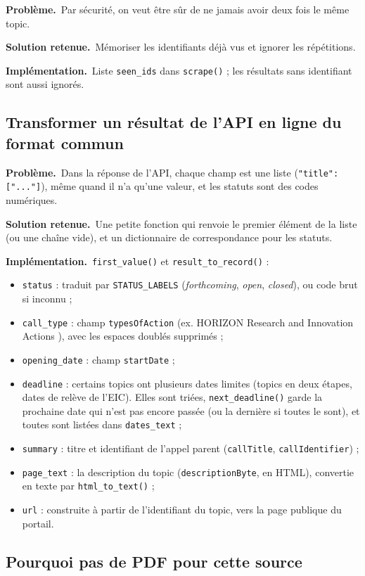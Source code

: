\documentclass[11pt,a4paper]{article}
\newcommand{\pb}{\par\medskip\noindent\textbf{\textcolor{pbcolor}{Problème.}}\ }
\newcommand{\sol}{\par\medskip\noindent\textbf{\textcolor{solcolor}{Solution retenue.}}\ }
\newcommand{\impl}{\par\medskip\noindent\textbf{\textcolor{implcolor}{Implémentation.}}\ }
\newcommand{\code}[1]{\texttt{#1}}
\begin{document}
\pb Par sécurité, on veut être sûr de ne jamais avoir deux fois le même topic.

\sol Mémoriser les identifiants déjà vus et ignorer les répétitions.

\impl Liste \code{seen\_ids} dans \code{scrape()} ; les résultats sans identifiant sont
aussi ignorés.

\subsection{Transformer un résultat de l'API en ligne du format commun}

\pb Dans la réponse de l'API, chaque champ est une liste (\code{"title": ["..."]}), même
quand il n'a qu'une valeur, et les statuts sont des codes numériques.

\sol Une petite fonction qui renvoie le premier élément de la liste (ou une chaîne vide),
et un dictionnaire de correspondance pour les statuts.

\impl \code{first\_value()} et \code{result\_to\_record()} :
\begin{itemize}
  \item \code{status} : traduit par \code{STATUS\_LABELS} (\emph{forthcoming}, \emph{open},
        \emph{closed}), ou code brut si inconnu ;
  \item \code{call\_type} : champ \code{typesOfAction} (ex. \og HORIZON Research and Innovation
        Actions \fg), avec les espaces doublés supprimés ;
  \item \code{opening\_date} : champ \code{startDate} ;
  \item \code{deadline} : certains topics ont plusieurs dates limites (topics en deux étapes,
        dates de relève de l'EIC). Elles sont triées, \code{next\_deadline()} garde la
        prochaine date qui n'est pas encore passée (ou la dernière si toutes le sont), et
        toutes sont listées dans \code{dates\_text} ;
  \item \code{summary} : titre et identifiant de l'appel parent (\code{callTitle},
        \code{callIdentifier}) ;
  \item \code{page\_text} : la description du topic (\code{descriptionByte}, en HTML),
        convertie en texte par \code{html\_to\_text()} ;
  \item \code{url} : construite à partir de l'identifiant du topic, vers la page publique du portail.
\end{itemize}

\subsection{Pourquoi pas de PDF pour cette source}
\end{document}
